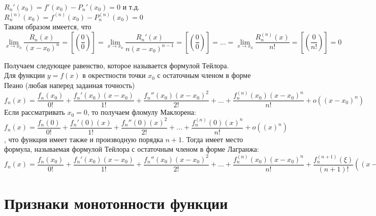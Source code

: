 \documentclass[oneside]{book}
\begin{document}
\begin{itemize}
\begin{enumerate}
$R_n'(x_0)=f'(x_0)-P_n'(x_0)=0$ и т.д.\\
$R_n^{(n)}(x_0)=f^{(n)}(x_0)-P_n^{(n)}(x_0)=0$\\
Таким образом имеется, что
$\lim \limits_{x \rightarrow x_0}\dfrac{R_n(x)}{(x-x_0)^n}=[(\dfrac{0}{0})]=\lim \limits_{x \rightarrow x_0}\dfrac{R_n'(x)}{n(x-x_0)^{n-1}}=[(\dfrac{0}{0})]=...=\lim \limits_{x \rightarrow x_0}\dfrac{R_n^{(n)}(x)}{n!}=[(\dfrac{0}{n!})]=0$
\par Получаем следующее равенство, которое называется формулой Тейлора.\\
Для функции $y=f(x)$ в окрестности точки $x_0$ с остаточным членом в форме Пеано (любая наперед заданная точность)
\\$f_n(x)=\dfrac{f_n(x_0)}{0!}+\dfrac{f_n'(x_0)(x-x_0)}{1!}+\dfrac{f_n''(x_0)(x-x_0)^2}{2!}+...+\dfrac{f_n^{(n)}(x_0)(x-x_0)^n}{n!}+o((x-x_0)^n)$\\
Если рассматривать $x_0=0$, то получаем фломулу Маклорена:\\
$f_n(x)=\dfrac{f_n(0)}{0!}+\dfrac{f_n'(0)(x)}{1!}+\dfrac{f_n''(0)(x)^2}{2!}+...+\dfrac{f_n^{(n)}(0)(x)^n}{n!}+o((x)^n)$
, что функция имеет также и производную порядка $n+1$. Тогда имеет место формула, называемая формулой Тейлора с остаточным членом в форме Лагранжа:\\
$f_n(x)=\dfrac{f_n(x_0)}{0!}+\dfrac{f_n'(x_0)(x-x_0)}{1!}+\dfrac{f_n''(x_0)(x-x_0)^2}{2!}+...+\dfrac{f_n^{(n)}(x_0)(x-x_0)^n}{n!}+\dfrac{f_n^{(n+1)}(\xi)}{(n+1)!}((x-x_0)^{n+1}),\xi \in (x_0;x)$
\setcounter{chapter}{26}         
\chapter{Признаки монотонности функции\\}         


\end{enumerate}
\end{itemize}
\end{document}
